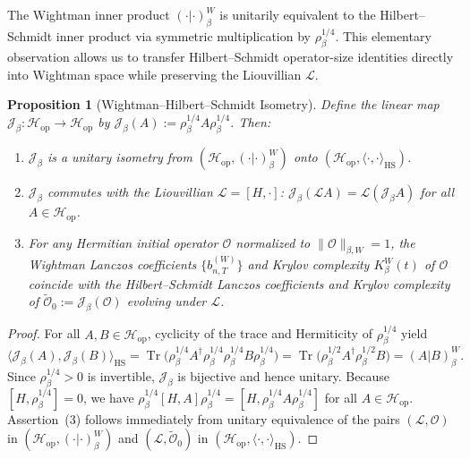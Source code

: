 \documentclass[11pt,a4paper]{article}
\numberwithin{equation}{section}
\theoremstyle{plain}
\newtheorem{proposition}[theorem]{Proposition}
\theoremstyle{definition}
\newcommand{\Hop}{\mathcal{H}_{\mathrm{op}}}
\newcommand{\HS}{\mathrm{HS}}
\newcommand{\Tr}{\operatorname{Tr}}
\begin{document}
The Wightman inner product $(\cdot|\cdot)_\beta^W$ is unitarily equivalent to the Hilbert--Schmidt inner product via symmetric multiplication by $\rho_\beta^{1/4}$. This elementary observation allows us to transfer Hilbert--Schmidt operator-size identities directly into Wightman space while preserving the Liouvillian $\mathcal{L}$.

\begin{proposition}[Wightman--Hilbert--Schmidt Isometry]\label{prop:isometry}
Define the linear map $\mathcal{J}_\beta:\Hop\to\Hop$ by $\mathcal{J}_\beta(A) := \rho_\beta^{1/4} A \rho_\beta^{1/4}$. Then:
\begin{enumerate}
  \setlength{\itemsep}{2pt}\setlength{\parskip}{0pt}
  \item[\emph{(1)}] $\mathcal{J}_\beta$ is a unitary isometry from $(\Hop,(\cdot|\cdot)_\beta^W)$ onto $(\Hop,\langle\cdot,\cdot\rangle_\HS)$.
  \item[\emph{(2)}] $\mathcal{J}_\beta$ commutes with the Liouvillian $\mathcal{L}=[H,\cdot]$: $\mathcal{J}_\beta(\mathcal{L}A) = \mathcal{L}(\mathcal{J}_\beta A)$ for all $A\in\Hop$.
  \item[\emph{(3)}] For any Hermitian initial operator $\mathcal{O}$ normalized to $\|\mathcal{O}\|_{\beta,W}=1$, the Wightman Lanczos coefficients $\{b_{n,T}^{(W)}\}$ and Krylov complexity $K_\beta^W(t)$ of $\mathcal{O}$ coincide with the Hilbert--Schmidt Lanczos coefficients and Krylov complexity of $\widetilde{\mathcal{O}}_0 := \mathcal{J}_\beta(\mathcal{O})$ evolving under $\mathcal{L}$.
\end{enumerate}
\end{proposition}

\begin{proof}
For all $A,B\in\Hop$, cyclicity of the trace and Hermiticity of $\rho_\beta^{1/4}$ yield
\[
  \langle\mathcal{J}_\beta(A),\mathcal{J}_\beta(B)\rangle_\HS
  = \Tr\!\bigl(\rho_\beta^{1/4}A^\dagger\rho_\beta^{1/4}\rho_\beta^{1/4}B\rho_\beta^{1/4}\bigr)
  = \Tr\!\bigl(\rho_\beta^{1/2}A^\dagger\rho_\beta^{1/2}B\bigr)
  = (A|B)_\beta^W.
\]
Since $\rho_\beta^{1/4}>0$ is invertible, $\mathcal{J}_\beta$ is bijective and hence unitary. Because $[H,\rho_\beta^{1/4}]=0$, we have $\rho_\beta^{1/4}[H,A]\rho_\beta^{1/4} = [H,\rho_\beta^{1/4}A\rho_\beta^{1/4}]$ for all $A\in\Hop$. Assertion~(3) follows immediately from unitary equivalence of the pairs $(\mathcal{L},\mathcal{O})$ in $(\Hop,(\cdot|\cdot)_\beta^W)$ and $(\mathcal{L},\widetilde{\mathcal{O}}_0)$ in $(\Hop,\langle\cdot,\cdot\rangle_\HS)$.
\end{proof}
\end{document}
